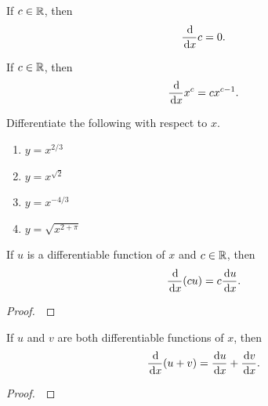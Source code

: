 \setcounter{chapter}{3}
\setcounter{section}{3}
\setcounter{theorem}{0}
\setcounter{equation}{0}


\begin{theorem}
If $c\in\mathbb R$, then 
\begin{equation*}
\frac{\mkern 2mu \mathrm{d}}{\mkern 2mu \mathrm{d} x}c = 0.
\end{equation*}
\end{theorem}
\begin{theorem}
If $c\in\mathbb R$, then 
\begin{equation*}
\frac{\mkern 2mu \mathrm{d}}{\mkern 2mu \mathrm{d} x}x^c = cx^{c-1}.
\end{equation*}
\end{theorem}

\begin{example}
Differentiate the following with respect to $x$.
\begin{enumerate}[label=(\alph*)]
\item $y=x^{2/3}$
\vfill
\item $y=x^{\sqrt 2}$
\vfill
\item $y=x^{-4/3}$
\vfill
\item $y=\sqrt{x^{2+\pi}}$
\vfill
\end{enumerate}
\end{example}

\newpage

\begin{theorem}
If $u$ is a differentiable function of $x$ and $c\in\mathbb R$, then
\begin{equation*}
\frac{\mkern 2mu \mathrm{d}}{\mkern 2mu \mathrm{d} x}(cu) = c\frac{\mkern 2mu \mathrm{d} u}{\mkern 2mu \mathrm{d} x}.
\end{equation*}
\end{theorem}
\begin{proof}\,

\vspace{3in}
\end{proof}

\begin{theorem}
If $u$ and $v$ are both differentiable functions of $x$, then
\begin{equation*}
\frac{\mkern 2mu \mathrm{d}}{\mkern 2mu \mathrm{d} x}(u+v) = \frac{\mkern 2mu \mathrm{d} u}{\mkern 2mu \mathrm{d} x} + \frac{\mkern 2mu \mathrm{d} v}{\mkern 2mu \mathrm{d} x}.
\end{equation*}
\end{theorem}
\begin{proof}\,

\vspace{3in}
\end{proof}

